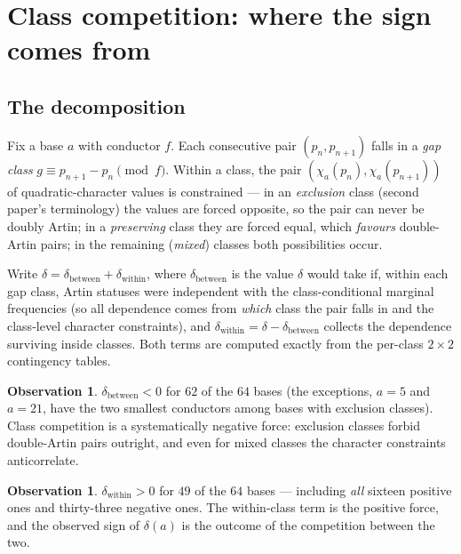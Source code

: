 \documentclass[11pt,reqno]{amsart}
\theoremstyle{plain}
\theoremstyle{definition}
\newtheorem{observation}[theorem]{Observation}
\begin{document}
\section{Class competition: where the sign comes from}
\label{sec:competition}

\subsection{The decomposition}
Fix a base $a$ with conductor $f$. Each consecutive pair $(p_n, p_{n+1})$
falls in a \emph{gap class} $g \equiv p_{n+1} - p_n \pmod f$. Within a class,
the pair $(\chi_a(p_n), \chi_a(p_{n+1}))$ of quadratic-character values is
constrained --- in an \emph{exclusion} class (second paper's terminology) the
values are forced opposite, so the pair can never be doubly Artin; in a
\emph{preserving} class they are forced equal, which \emph{favours} double-Artin
pairs; in the remaining (\emph{mixed}) classes both possibilities occur.

Write $\delta = \delta_{\mathrm{between}} + \delta_{\mathrm{within}}$, where
$\delta_{\mathrm{between}}$ is the value $\delta$ would take if, within each
gap class, Artin statuses were independent with the class-conditional
marginal frequencies (so all dependence comes from \emph{which} class the
pair falls in and the class-level character constraints), and
$\delta_{\mathrm{within}} = \delta - \delta_{\mathrm{between}}$ collects the
dependence surviving inside classes. Both terms are computed exactly from
the per-class $2\times2$ contingency tables.

\begin{observation}
\label{obs:between}
$\delta_{\mathrm{between}} < 0$ for $62$ of the $64$ bases (the exceptions,
$a = 5$ and $a = 21$, have the two smallest conductors among bases with
exclusion classes). Class competition is a systematically negative force:
exclusion classes forbid double-Artin pairs outright, and even for mixed
classes the character constraints anticorrelate.
\end{observation}

\begin{observation}
\label{obs:within}
$\delta_{\mathrm{within}} > 0$ for $49$ of the $64$ bases --- including
\emph{all} sixteen positive ones and thirty-three negative ones. The
within-class term is the positive force, and the observed sign of
$\delta(a)$ is the outcome of the competition between the two.
\end{observation}
\end{document}
